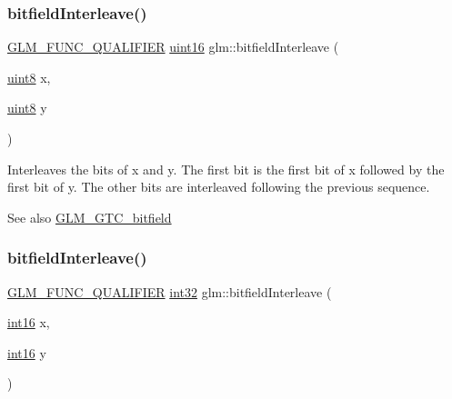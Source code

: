 \subsubsection{\texorpdfstring{bitfield\+Interleave()}{bitfieldInterleave()}\hspace{0.1cm}{\footnotesize\ttfamily [2/16]}}
{\footnotesize\ttfamily \mbox{\hyperlink{setup_8hpp_a33fdea6f91c5f834105f7415e2a64407}{G\+L\+M\+\_\+\+F\+U\+N\+C\+\_\+\+Q\+U\+A\+L\+I\+F\+I\+ER}} \mbox{\hyperlink{group__gtc__type__precision_gad8c2939e1fdd8e5828b31d95c52255d5}{uint16}} glm\+::bitfield\+Interleave (\begin{DoxyParamCaption}\item[{\mbox{\hyperlink{group__gtc__type__precision_ga1a7dcd8aac97cc8020817c94049deff2}{uint8}}}]{x,  }\item[{\mbox{\hyperlink{group__gtc__type__precision_ga1a7dcd8aac97cc8020817c94049deff2}{uint8}}}]{y }\end{DoxyParamCaption})}

Interleaves the bits of x and y. The first bit is the first bit of x followed by the first bit of y. The other bits are interleaved following the previous sequence.

\begin{DoxySeeAlso}{See also}
\mbox{\hyperlink{group__gtc__bitfield}{G\+L\+M\+\_\+\+G\+T\+C\+\_\+bitfield}} 
\end{DoxySeeAlso}
\mbox{\label{group__gtc__bitfield_ga1a0264598647ae00a596865af4e1e878}} 
\subsubsection{\texorpdfstring{bitfield\+Interleave()}{bitfieldInterleave()}\hspace{0.1cm}{\footnotesize\ttfamily [3/16]}}
{\footnotesize\ttfamily \mbox{\hyperlink{setup_8hpp_a33fdea6f91c5f834105f7415e2a64407}{G\+L\+M\+\_\+\+F\+U\+N\+C\+\_\+\+Q\+U\+A\+L\+I\+F\+I\+ER}} \mbox{\hyperlink{group__gtc__type__precision_ga632d8b25f6b61659f39ea4321fab92a4}{int32}} glm\+::bitfield\+Interleave (\begin{DoxyParamCaption}\item[{\mbox{\hyperlink{group__gtc__type__precision_ga2945a61d12771f8954994fcddf02b021}{int16}}}]{x,  }\item[{\mbox{\hyperlink{group__gtc__type__precision_ga2945a61d12771f8954994fcddf02b021}{int16}}}]{y }\end{DoxyParamCaption})}


